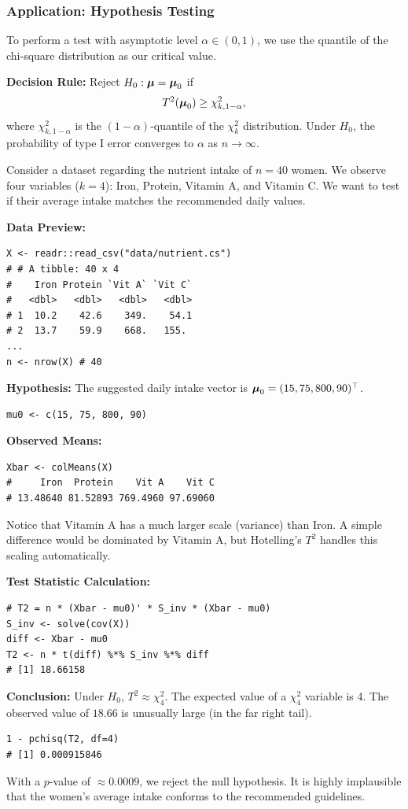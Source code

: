 \subsubsection{Application: Hypothesis Testing}
\label{par:Application:}

To perform a test with asymptotic level $\alpha \in (0,1)$, we use the quantile of the chi-square distribution as our critical value.

\textbf{Decision Rule:} Reject $H_0: \boldsymbol{\mu}=\boldsymbol{\mu}_{0}$ if
\[
    T^2(\boldsymbol{\mu}_{0}) \ge \chi^2_{k, 1-\alpha},
\]
where $\chi^2_{k, 1-\alpha}$ is the $(1-\alpha)$-quantile of the $\chi^2_k$ distribution.
Under $H_0$, the probability of type I error converges to $\alpha$ as $n \to \infty$.

\begin{ex}
    Consider a dataset regarding the nutrient intake of $n=40$ women. We observe four variables ($k=4$): Iron, Protein, Vitamin A, and Vitamin C. We want to test if their average intake matches the recommended daily values.

    \textbf{Data Preview:}
    \begin{verbatim}
X <- readr::read_csv("data/nutrient.cs")
# # A tibble: 40 x 4
#    Iron Protein `Vit A` `Vit C`
#   <dbl>   <dbl>   <dbl>   <dbl>
# 1  10.2    42.6    349.    54.1
# 2  13.7    59.9    668.   155.
...
n <- nrow(X) # 40
    \end{verbatim}

    \textbf{Hypothesis:}
    The suggested daily intake vector is $\boldsymbol{\mu}_0 = (15, 75, 800, 90)^\top$.
    \begin{verbatim}
mu0 <- c(15, 75, 800, 90)
    \end{verbatim}

    \textbf{Observed Means:}
    \begin{verbatim}
Xbar <- colMeans(X)
#     Iron  Protein    Vit A    Vit C
# 13.48640 81.52893 769.4960 97.69060
    \end{verbatim}
    Notice that Vitamin A has a much larger scale (variance) than Iron. A simple difference would be dominated by Vitamin A, but Hotelling's $T^2$ handles this scaling automatically.

    \textbf{Test Statistic Calculation:}
    \begin{verbatim}
# T2 = n * (Xbar - mu0)' * S_inv * (Xbar - mu0)
S_inv <- solve(cov(X))
diff <- Xbar - mu0
T2 <- n * t(diff) %*% S_inv %*% diff
# [1] 18.66158
    \end{verbatim}

    \textbf{Conclusion:}
    Under $H_0$, $T^2 \approx \chi^2_4$. The expected value of a $\chi^2_4$ variable is 4. The observed value of $18.66$ is unusually large (in the far right tail).
    \begin{verbatim}
1 - pchisq(T2, df=4)
# [1] 0.000915846
    \end{verbatim}
    With a $p$-value of $\approx 0.0009$, we reject the null hypothesis. It is highly implausible that the women's average intake conforms to the recommended guidelines.
\end{ex}

